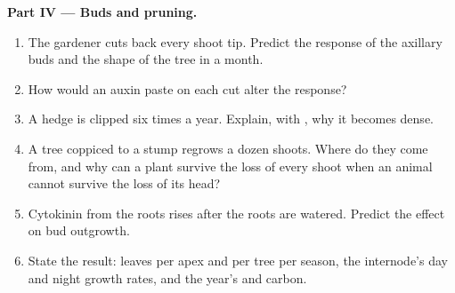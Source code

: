 \begin{problem}
\medskip
\noindent\textbf{Part IV --- Buds and pruning.}
\begin{enumerate}[resume]
  \item The gardener cuts back every shoot tip. Predict the response
        of the axillary buds and the shape of the tree in a month.
  \item How would an auxin paste on each cut alter the response?
  \item A hedge is clipped six times a year. Explain, with , why it becomes dense.
  \item A tree coppiced to a stump regrows a dozen shoots. Where do
        they come from, and why can a plant survive the loss of every
        shoot when an animal cannot survive the loss of its head?
  \item Cytokinin from the roots rises after the roots are watered.
        Predict the effect on bud outgrowth.
  \item State the result: leaves per apex and per tree per season,
        the internode's day and night growth rates, and the year's
         and carbon.
\end{enumerate}
\end{problem}
